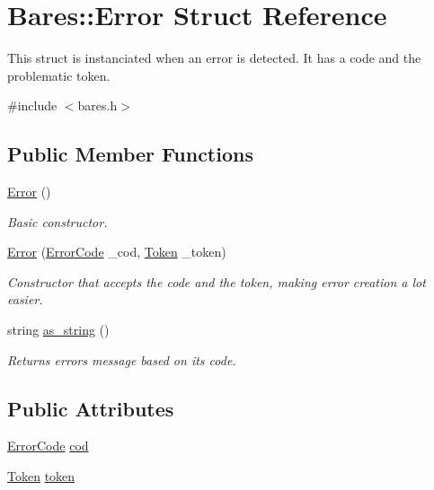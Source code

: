\hypertarget{structBares_1_1Error}{}\section{Bares\+:\+:Error Struct Reference}
\label{structBares_1_1Error}


This struct is instanciated when an error is detected. It has a code and the problematic token.  




{\ttfamily \#include $<$bares.\+h$>$}

\subsection*{Public Member Functions}
\begin{DoxyCompactItemize}
\item 
\hyperlink{structBares_1_1Error_a0f41c23a4131601bd3a40b3da437aff3}{Error} ()\hypertarget{structBares_1_1Error_a0f41c23a4131601bd3a40b3da437aff3}{}\label{structBares_1_1Error_a0f41c23a4131601bd3a40b3da437aff3}

\begin{DoxyCompactList}\small\item\em Basic constructor. \end{DoxyCompactList}\item 
\hyperlink{structBares_1_1Error_ac6923532df1536c5d45743bc1e254e80}{Error} (\hyperlink{classBares_ad484a97e0efc1721d2b95209a1700e44}{Error\+Code} \+\_\+cod, \hyperlink{structBares_1_1Token}{Token} \+\_\+token)\hypertarget{structBares_1_1Error_ac6923532df1536c5d45743bc1e254e80}{}\label{structBares_1_1Error_ac6923532df1536c5d45743bc1e254e80}

\begin{DoxyCompactList}\small\item\em Constructor that accepts the code and the token, making error creation a lot easier. \end{DoxyCompactList}\item 
string \hyperlink{structBares_1_1Error_a1c87f5fbdb64538f5b61647691dd4326}{as\+\_\+string} ()
\begin{DoxyCompactList}\small\item\em Returns error\textquotesingle{}s message based on it\textquotesingle{}s code. \end{DoxyCompactList}\end{DoxyCompactItemize}
\subsection*{Public Attributes}
\begin{DoxyCompactItemize}
\item 
\hyperlink{classBares_ad484a97e0efc1721d2b95209a1700e44}{Error\+Code} \hyperlink{structBares_1_1Error_a1aee8c1fc0890dc5cad59487f4ce24c3}{cod}
\item 
\hyperlink{structBares_1_1Token}{Token} \hyperlink{structBares_1_1Error_ac7804e7cdb26d8132000ec7587db2e67}{token}
\end{DoxyCompactItemize}


